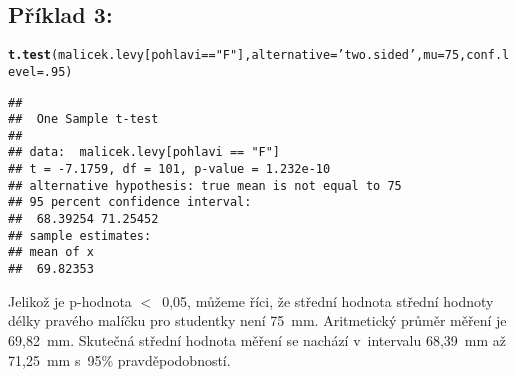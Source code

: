 \documentclass[twoside]{article}\usepackage[]{graphicx}\usepackage[]{color}
\makeatletter
\newcommand{\hlnum}[1]{\textcolor[rgb]{0.686,0.059,0.569}{#1}}%
\newcommand{\hlstr}[1]{\textcolor[rgb]{0.192,0.494,0.8}{#1}}%
\newcommand{\hlopt}[1]{\textcolor[rgb]{0,0,0}{#1}}%
\newcommand{\hlstd}[1]{\textcolor[rgb]{0.345,0.345,0.345}{#1}}%
\newcommand{\hlkwc}[1]{\textcolor[rgb]{0.333,0.667,0.333}{#1}}%
\newcommand{\hlkwd}[1]{\textcolor[rgb]{0.737,0.353,0.396}{\textbf{#1}}}%
\newenvironment{kframe}{%
 \def\at@end@of@kframe{}%
 \ifinner\ifhmode%
  \def\at@end@of@kframe{\end{minipage}}%
  \begin{minipage}{\columnwidth}%
 \fi\fi%
 \def\FrameCommand##1{\hskip\@totalleftmargin \hskip-\fboxsep
 \colorbox{shadecolor}{##1}\hskip-\fboxsep
     \hskip-\linewidth \hskip-\@totalleftmargin \hskip\columnwidth}%
 \MakeFramed {\advance\hsize-\width
   \@totalleftmargin\z@ \linewidth\hsize
   \@setminipage}}%
 {\par\unskip\endMakeFramed%
 \at@end@of@kframe}
\newenvironment{knitrout}{}{} %
\makeatother
\begin{document}
\subsection*{Příklad 3:}
\begin{knitrout}
\color{fgcolor}\begin{kframe}
\begin{alltt}
\hlkwd{t.test}\hlstd{(malicek.levy[pohlavi} \hlopt{==} \hlstr{"F"}\hlstd{],} \hlkwc{alternative}\hlstd{=}\hlstr{'two.sided'}\hlstd{,} \hlkwc{mu}\hlstd{=}\hlnum{75}\hlstd{,} \hlkwc{conf.level}\hlstd{=}\hlnum{.95}\hlstd{)}
\end{alltt}
\begin{verbatim}
## 
## 	One Sample t-test
## 
## data:  malicek.levy[pohlavi == "F"]
## t = -7.1759, df = 101, p-value = 1.232e-10
## alternative hypothesis: true mean is not equal to 75
## 95 percent confidence interval:
##  68.39254 71.25452
## sample estimates:
## mean of x 
##  69.82353
\end{verbatim}
\end{kframe}
\end{knitrout}
Jelikož je p-hodnota $<$~0,05, můžeme říci, že střední hodnota střední hodnoty délky pravého malíčku pro studentky není 75~\si{\milli\metre}. Aritmetický průměr měření je 69,82~\si{\milli\metre}. Skutečná střední hodnota měření se nachází v~intervalu 68,39~\si{\milli\metre} až 71,25~\si{\milli\metre} s~95\% pravděpodobností.
\end{document}
